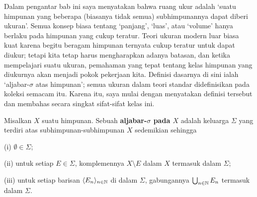 
\def\chaptername{Ruang ukur}
\def\sectionname{Aljabar-$\sigma$}


Dalam pengantar bab ini saya menyatakan bahwa ruang ukur adalah
`suatu himpunan yang beberapa (biasanya tidak semua) subhimpunannya
dapat diberi ukuran'. Semua konsep biasa tentang `panjang', `luas',
atau `volume' hanya berlaku pada himpunan yang cukup teratur. Teori
ukuran modern luar biasa kuat karena begitu beragam himpunan ternyata
cukup teratur untuk dapat diukur; tetapi kita tetap
harus mengharapkan adanya batasan, dan ketika mempelajari suatu ukuran,
pemahaman yang tepat tentang kelas himpunan yang diukurnya akan menjadi
pokok pekerjaan kita. Definisi dasarnya di sini ialah `aljabar-$\sigma$
atas himpunan'; semua ukuran dalam teori standar didefinisikan pada
koleksi semacam itu. Karena itu, saya mulai dengan menyatakan definisi
tersebut dan membahas secara singkat sifat-sifat kelas ini.


 Misalkan $X$ suatu himpunan. Sebuah
{\bf aljabar-$\sigma$ pada $X$} adalah keluarga $\Sigma$ yang terdiri
atas subhimpunan-subhimpunan $X$ sedemikian sehingga

\qquad(i) $\emptyset\in\Sigma$;

\qquad(ii) untuk setiap $E\in\Sigma$, komplemennya $X\setminus E$ dalam
$X$ termasuk dalam $\Sigma$;

\qquad(iii) untuk setiap barisan $\langle E_n\rangle_{n\in\Bbb N}$ di
dalam $\Sigma$, gabungannya $\bigcup_{n\in\Bbb N}E_n$ termasuk dalam
$\Sigma$.


